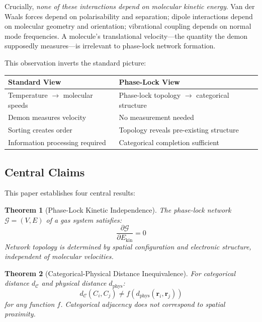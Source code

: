 \documentclass[12pt,a4paper]{article}
\newtheorem{theorem}{Theorem}[section]
\theoremstyle{definition}
\theoremstyle{remark}
\newcommand{\phaselockgraph}{\mathcal{G}}
\newcommand{\catspace}{\mathcal{C}}
\begin{document}
Crucially, \textit{none of these interactions depend on molecular kinetic energy}. Van der Waals forces depend on polarisability and separation; dipole interactions depend on molecular geometry and orientation; vibrational coupling depends on normal mode frequencies. A molecule's translational velocity---the quantity the demon supposedly measures---is irrelevant to phase-lock network formation.

This observation inverts the standard picture:
\begin{center}
\begin{tabular}{l|l}
\textbf{Standard View} & \textbf{Phase-Lock View} \\
\hline
Temperature $\to$ molecular speeds & Phase-lock topology $\to$ categorical structure \\
Demon measures velocity & No measurement needed \\
Sorting creates order & Topology reveals pre-existing structure \\
Information processing required & Categorical completion sufficient
\end{tabular}
\end{center}

\subsection{Central Claims}

This paper establishes four central results:

\begin{theorem}[Phase-Lock Kinetic Independence]
\label{thm:kinetic_independence_intro}
The phase-lock network $\phaselockgraph = (V, E)$ of a gas system satisfies:
\begin{equation}
\frac{\partial \phaselockgraph}{\partial E_{\text{kin}}} = 0
\end{equation}
Network topology is determined by spatial configuration and electronic structure, independent of molecular velocities.
\end{theorem}

\begin{theorem}[Categorical-Physical Distance Inequivalence]
\label{thm:distance_inequivalence_intro}
For categorical distance $d_{\catspace}$ and physical distance $d_{\text{phys}}$:
\begin{equation}
d_{\catspace}(C_i, C_j) \neq f(d_{\text{phys}}(\mathbf{r}_i, \mathbf{r}_j))
\end{equation}
for any function $f$. Categorical adjacency does not correspond to spatial proximity.
\end{theorem}
\end{document}
